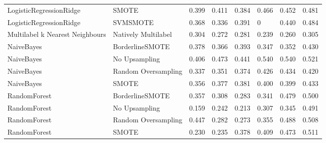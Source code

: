 \begin{tabular}{llllllll}
        LogisticRegressionRidge &                         SMOTE & 0.399 &                     0.411 &                 0.384 &                  0.466 &                                   0.452 &    0.481 \\
        LogisticRegressionRidge &                      SVMSMOTE & 0.368 &                     0.336 &                 0.391 &                      0 &                                   0.440 &    0.484 \\
Multilabel k Nearest Neighbours &           Natively Multilabel & 0.304 &                     0.272 &                 0.281 &                  0.239 &                                   0.260 &    0.305 \\
                     NaiveBayes &               BorderlineSMOTE & 0.378 &                     0.366 &                 0.393 &                  0.347 &                                   0.352 &    0.430 \\
                     NaiveBayes &                 No Upsampling & 0.406 &                     0.473 &                 0.441 &                  0.540 &                                   0.540 &    0.521 \\
                     NaiveBayes &           Random Oversampling & 0.337 &                     0.351 &                 0.374 &                  0.426 &                                   0.434 &    0.420 \\
                     NaiveBayes &                         SMOTE & 0.356 &                     0.377 &                 0.381 &                  0.400 &                                   0.399 &    0.433 \\
                   RandomForest &               BorderlineSMOTE & 0.357 &                     0.308 &                 0.283 &                  0.341 &                                   0.479 &    0.500 \\
                   RandomForest &                 No Upsampling & 0.159 &                     0.242 &                 0.213 &                  0.307 &                                   0.345 &    0.491 \\
                   RandomForest &           Random Oversampling & 0.447 &                     0.282 &                 0.273 &                  0.355 &                                   0.488 &    0.508 \\
                   RandomForest &                         SMOTE & 0.230 &                     0.235 &                 0.378 &                  0.409 &                                   0.473 &    0.511 \\

\end{tabular}
